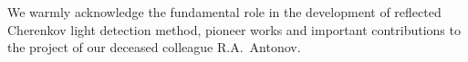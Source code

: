 \documentclass[a4paper,11pt]{article}
\begin{document}
\acknowledgments
We warmly acknowledge the fundamental role in the development of reflected Cherenkov light detection method, pioneer works and important contributions to the project of our deceased colleague R.A.~Antonov.












\end{document}
